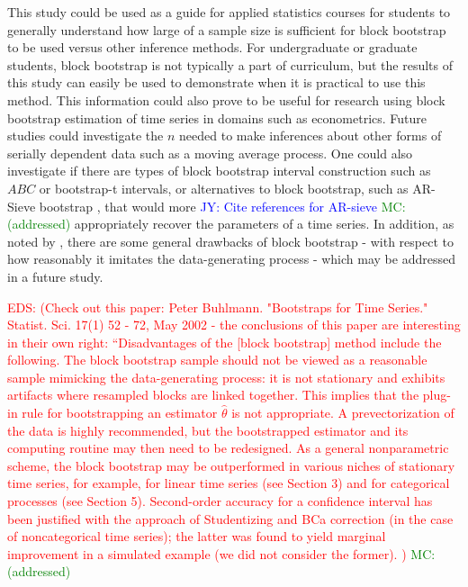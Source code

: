 \documentclass[12pt, letterpaper, titlepage]{article}
\newcommand{\jy}[1]{\textcolor{blue}{JY: #1}}
\newcommand{\eds}[1]{\textcolor{red}{EDS: (#1)}}
\newcommand{\mc}[1]{\textcolor{green}{MC: (#1)}}
\begin{document}
This study could be used as a guide for applied statistics courses for students
to generally understand how large of a sample size is sufficient for block
bootstrap to be used versus other inference methods. For undergraduate or
graduate students, block bootstrap is not typically a part of curriculum, but
the results of this study can easily be used to demonstrate when it is
practical to use this method. This information could also prove to be useful
for research using block bootstrap estimation of time series in domains such
as econometrics. Future studies could investigate the $n$ needed to make
inferences about other forms
of serially dependent data such as a moving average process. One could also
investigate if there are types of block
bootstrap interval construction such as $ABC$ or bootstrap-t intervals, or
alternatives to block bootstrap, such as AR-Sieve bootstrap
 \citep{kreiss1992bootstrap}, that would more
\jy{Cite references for AR-sieve} \mc{addressed}
appropriately recover the parameters of a time series. In addition, as noted by
\citet{buhlmann2002bootstraps}, there are some 
general drawbacks of block bootstrap - with respect to how reasonably it imitates 
the data-generating process - which may be addressed in a future study.


\eds{Check out this paper:
Peter Buhlmann. "Bootstraps for Time Series." Statist. Sci. 17(1) 52 - 72, 
May 2002 - the conclusions of this paper are interesting in their own right:
``Disadvantages of the [block bootstrap] method include the following.
The block bootstrap sample should not be viewed as
a reasonable sample mimicking the data-generating
process: it is not stationary and exhibits artifacts where
resampled blocks are linked together. This implies that
the plug-in rule for bootstrapping an estimator $\hat{\theta}$ is not
appropriate. A prevectorization of the data is highly
recommended, but the bootstrapped estimator and its
computing routine may then need to be redesigned. As
a general nonparametric scheme, the block bootstrap
may be outperformed in various niches of stationary
time series, for example, for linear time series (see Section 3) 
and for categorical processes (see Section 5).
Second-order accuracy for a confidence interval has
been justified with the approach of Studentizing and
BCa correction (in the case of noncategorical time series); 
the latter was found to yield marginal improvement in a 
simulated example (we did not consider the former). } \mc{addressed}
	





\end{document}
